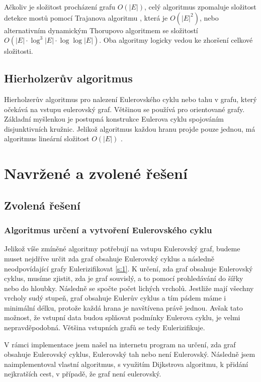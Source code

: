 \documentclass[12pt]{article}
\begin{document}
Ačkoliv je složitost procházení grafu $O(|E|)$, celý algoritmus zpomaluje složitost detekce mostů pomocí Trajanova algoritmu \cite{Tarjan}, která je $O(|E|^2)$, nebo alternativním dynamickým Thorupovo algoritmem \cite{Thorup} se složitostí \newline \noindent $O(|E| \cdot \log^3 |E| \cdot \log \log |E|)$. Oba algoritmy logicky vedou ke zhoršení celkové složitosti.

\subsection{Hierholzerův algoritmus}
Hierholzerův algoritmus \cite{Eulerian, Hierholzer} pro nalezení Eulerovského cyklu nebo tahu v grafu, který očekává na vstupu eulerovský graf. Většinou se používá pro orientované grafy. Základní myšlenkou je postupná konstrukce Eulerova cyklu spojováním disjunktivních kružnic. Jelikož algoritmus každou hranu projde pouze jednou, má algoritmus lineární složitost $O(|E|)$ .

\section{Navržené a zvolené řešení}

\subsection{Zvolená řešení}

\subsubsection{Algoritmus určení a vytvoření Eulerovského cyklu}
Jelikož víše zmíněné algoritmy potřebují na vstupu Eulerovský graf, budeme muset nejdříve určit zda graf obsahuje Eulerovský cyklus a následně neodpovídající grafy Eulerizifikovat \ref{s:1}. K určení, zda graf obsahuje Eulerovský cyklus, musíme zjistit, zda je graf souvislý, a to pomocí prohledávání do šířky nebo do hloubky. Následně se spočte počet lichých vrcholů. Jestliže mají všechny vrcholy sudý stupeň, graf obsahuje Eulerův cyklus a tím pádem máme i minimální délku, protože každá hrana je navštívena právě jednou. Avšak tato možnost, že vstupní data budou splňovat podmínky Eulerova cyklu, je velmi nepravděpodobná. Většina vstupních grafů se tedy Eulerizifikuje. 

V rámci implementace jsem našel na internetu program \cite{Geeks} na určení, zda graf obsahuje Eulerovský cyklus, Eulerovský tah nebo není Eulerovský. Následně jsem naimplementoval vlastní algoritmus, s využitím Dijkstrova algoritmu, k přidání nejkratších cest, v případě, že graf není eulerovský.
\end{document}
